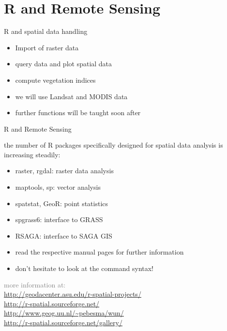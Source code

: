 \section{R and Remote Sensing}


\begin{frame}{R and spatial data handling}

      \begin{itemize}[<+->]
	\item Import of raster data
	\item query data and plot spatial data
	\item compute vegetation indices
	\item we will use Landsat and MODIS data
	\item further functions will be taught soon after
      \end{itemize}

\end{frame}


\begin{frame}{R and Remote Sensing}
 
    the number of R packages specifically designed for spatial data analysis is increasing steadily:

	  \begin{itemize}
	    \item raster, rgdal: raster data analysis
	    \item maptools, sp: vector analysis
	    \item spatstat, GeoR: point statistics  
	    \item spgrass6: interface to GRASS
	    \item RSAGA: interface to SAGA GIS
	    \item read the respective manual pages for further information
	    \item don't hesitate to look at the command syntax!
	  \end{itemize}

    \vspace{1cm} \pause

	  \textcolor{gray}{
	  \begin{tiny}
	  \hspace{5cm}more information at:\\ 
	  \hspace{5cm} \url{http://geodacenter.asu.edu/r-spatial-projects/}\\ 
	  \hspace{5cm} \url{http://r-spatial.sourceforge.net/}\\
	  \hspace{5cm} \url{http://www.geog.uu.nl/~pebesma/wun/}\\
	  \hspace{5cm} \url{http://r-spatial.sourceforge.net/gallery/}\\
	  \end{tiny}
	  }


\end{frame}





